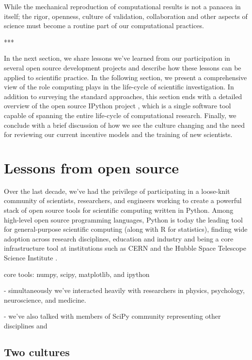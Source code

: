 \documentclass[ChapterTOCs,krantz2]{krantz} %
\newcommand{\parasep}{\begin{center}*\hspace{6em}*\hspace{6em}*\end{center}}
\begin{document}
While the mechanical reproduction of computational results is not a
panacea in itself; the rigor, openness, culture of validation, collaboration and
other aspects of science must become a routine part of our computational practices.

\parasep

In the next section, we share lessons we've learned from our participation in
several open source development projects and describe how these lessons can be
applied to scientific practice.  In the following section, we present a
comprehensive view of the role computing plays in the life-cycle of scientific
investigation.  In addition to surveying the standard approaches, this section
ends with a detailed overview of the open source IPython project
\cite{PER-GRA:2007}, which is a single software tool capable of spanning the
entire life-cycle of computational research.  Finally, we conclude with a brief
discussion of how we see the culture changing and the need for reviewing our
current incentive models and the training of new scientists.

\section{Lessons from open source}\label{lessons-oss}

Over the last decade, we've had the privilege of participating in a loose-knit
community of scientists, researchers, and engineers working to create a powerful
stack of open source tools for scientific computing written in Python.  Among
high-level open source programming languages, Python is today the leading tool
for general-purpose scientific computing (along with R for statistics),
finding wide adoption across research disciplines, education and industry and
being a core infrastructure tool at institutions such as CERN and the Hubble
Space Telescope Science Institute
\cite{millman2011python,Perez2011,ganga09,SST}.


core tools: numpy, scipy, matplotlib, and ipython

- simultaneously we've interacted heavily with researchers in
physics, psychology, neuroscience, and medicine.

- we've also talked with members of SciPy community representing
other disciplines and 


\subsection{Two cultures}
\end{document}
